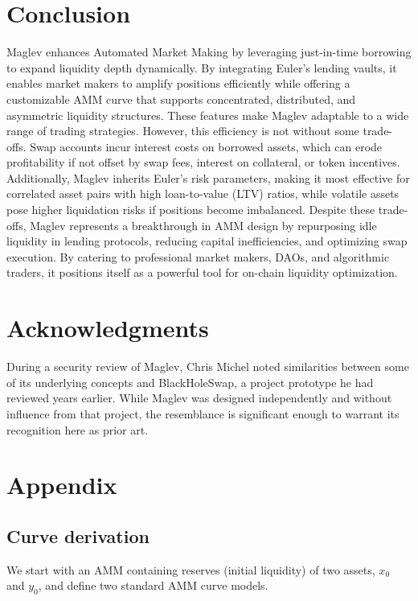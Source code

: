 \documentclass{article}
\begin{document}
\section{Conclusion}

Maglev enhances Automated Market Making by leveraging just-in-time borrowing to expand liquidity depth dynamically. By integrating Euler’s lending vaults, it enables market makers to amplify positions efficiently while offering a customizable AMM curve that supports concentrated, distributed, and asymmetric liquidity structures. These features make Maglev adaptable to a wide range of trading strategies. However, this efficiency is not without some trade-offs. Swap accounts incur interest costs on borrowed assets, which can erode profitability if not offset by swap fees, interest on collateral, or token incentives. Additionally, Maglev inherits Euler’s risk parameters, making it most effective for correlated asset pairs with high loan-to-value (LTV) ratios, while volatile assets pose higher liquidation risks if positions become imbalanced. Despite these trade-offs, Maglev represents a breakthrough in AMM design by repurposing idle liquidity in lending protocols, reducing capital inefficiencies, and optimizing swap execution. By catering to professional market makers, DAOs, and algorithmic traders, it positions itself as a powerful tool for on-chain liquidity optimization.

\section*{Acknowledgments}

During a security review of Maglev, Chris Michel noted similarities between some of its underlying concepts and BlackHoleSwap, a project prototype he had reviewed years earlier. While Maglev was designed independently and without influence from that project, the resemblance is significant enough to warrant its recognition here as prior art.

\newpage
\section{Appendix}

\subsection{Curve derivation}
\label{sec:curve-derivation}

We start with an AMM containing reserves (initial liquidity) of two assets, \( x_0 \) and \( y_0 \), and define two standard AMM curve models.
\end{document}
